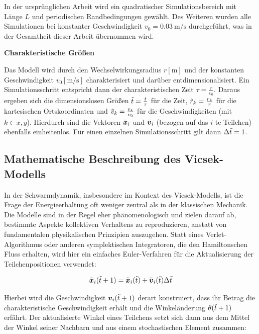 \documentclass{solutionclass}
\begin{document}
In der ursprünglichen Arbeit wird ein quadratischer Simulationsbereich mit Länge $L$ und periodischen Randbedingungen gewählt. Des Weiteren wurden alle Simulationen bei konstanter Geschwindigkeit $v_0 = \SI{0.03}{\meter\per\second}$ durchgeführt, was in der Gesamtheit dieser Arbeit übernommen wird.

\divider

\textbf{Charakteristische Größen}

Das Modell wird durch den Wechselwirkungsradius $r [\si{\meter}]$ und der konstanten Geschwindigkeit $v_0 [\si{\meter\per\second}]$ charakterisiert und darüber entdimensionalisiert. Ein Simulationsschritt entspricht dann der charakteristischen Zeit $\tau = \frac{r}{v_0}$. Daraus ergeben sich die dimensionslosen Größen $\Tilde{t} = \frac{t}{\tau}$ für die Zeit, $\Tilde{r}_k = \frac{r_k}{r}$ für die kartesischen Ortskoordinaten und $\Tilde{v}_k = \frac{v_k}{v_0}$ für die Geschwindigkeiten (mit $k \in {x, y}$). Hierdurch sind die Vektoren $\Tilde{\vec{x}}_i$ und $\Tilde{\vec{v}}_i$ (bezogen auf das $i$-te Teilchen) ebenfalls einheitenlos. Für einen einzelnen Simulationsschritt gilt dann $\Delta \Tilde{t} = 1$.


\subsection*{Mathematische Beschreibung des Vicsek-Modells}
In der Schwarmdynamik, insbesondere im Kontext des Vicsek-Modells, ist die Frage der Energieerhaltung oft weniger zentral als in der klassischen Mechanik. Die Modelle sind in der Regel eher phänomenologisch und zielen darauf ab, bestimmte Aspekte kollektiven Verhaltens zu reproduzieren, anstatt von fundamentalen physikalischen Prinzipien auszugehen. Statt eines Verlet-Algorithmus oder anderen symplektischen Integratoren, die den Hamiltonschen Fluss erhalten, wird hier ein einfaches Euler-Verfahren für die Aktualisierung der Teilchenpositionen verwendet:

\begin{equation}
    \Tilde{\vec{x}}_i(\Tilde{t}+1)=\Tilde{\vec{x}}_i(\Tilde{t})+\Tilde{\vec{v}}_i(\Tilde{t}) \Delta \Tilde{t}
    \label{eq:euler}
\end{equation}

Hierbei wird die Geschwindigkeit $\vec{v}_i(\Tilde{t} + 1)$ derart konstruiert, dass ihr Betrag die charakteristische Geschwindigkeit erhält und die Winkeländerung $\theta(\Tilde{t}+1)$ erfährt. Der aktualisierte Winkel eines Teilchens setzt sich dann aus dem Mittel der Winkel seiner Nachbarn und aus einem stochastischen Element zusammen:
\end{document}
